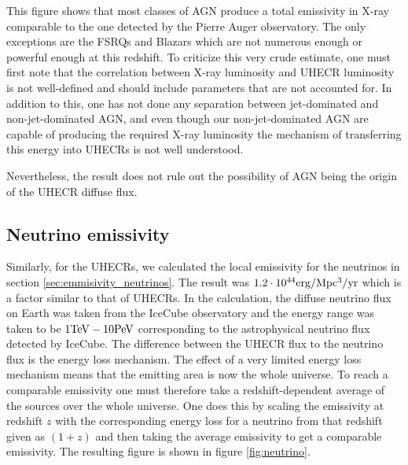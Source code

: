 This figure shows that most classes of AGN produce a total emissivity in X-ray comparable to the one detected by the Pierre Auger observatory. The only exceptions are the FSRQs and Blazars which are not numerous enough or powerful enough at this redshift. 
To criticize this very crude estimate, one must first note that the correlation between X-ray luminosity and UHECR luminosity is not well-defined and should include parameters that are not accounted for.
In addition to this, one has not done any separation between jet-dominated and non-jet-dominated AGN, and even though our non-jet-dominated AGN are capable of producing the required X-ray luminosity
the mechanism of transferring this energy into UHECRs is not well understood. 


Nevertheless, the result does not rule out the possibility of AGN being the origin of the UHECR diffuse flux. 


\subsection{Neutrino emissivity}
Similarly, for the UHECRs, we calculated the local emissivity for the neutrinos in section \ref{sec:emmisivity_neutrinos}. The result was $1.2 \cdot 10^{44} \rm erg/\rm Mpc^3\rm /yr$ which is a factor similar to that of UHECRs.
In the calculation, the diffuse neutrino flux on Earth was taken from the IceCube observatory \cite{Abbasi_2022} and the energy range was taken to be $1\rm TeV - 10\rm PeV$ corresponding to the astrophysical neutrino flux detected by IceCube.
The difference between the UHECR flux to the neutrino flux is the energy loss mechanism. The effect of a very limited energy loss mechanism means that the emitting area is now the whole universe. To reach a comparable emissivity one must therefore take a redshift-dependent average of the sources over the whole universe.
One does this by scaling the emissivity at redshift $z$ with the corresponding energy loss for a neutrino from that redshift given as $(1+z)$ and then taking the average emissivity to get a comparable emissivity.
The resulting figure is shown in figure \ref{fig:neutrino}.

